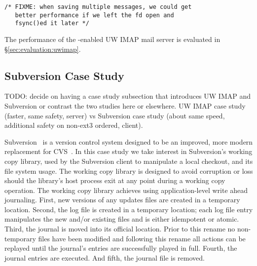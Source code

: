 \vspace{-0.5\baselineskip}
\begin{scriptsize}
\begin{verbatim}
/* FIXME: when saving multiple messages, we could get
   better performance if we left the fd open and
   fsync()ed it later */
\end{verbatim}
\end{scriptsize}
\vspace{-0.5\baselineskip}

The performance of the \opgroup{}-enabled UW IMAP mail server is
evaluated in \S\ref{sec:evaluation:uwimap}.

\subsection{Subversion Case Study}
\label{sec:opgroup:svn}

TODO: decide on having a case study subsection that introduces UW IMAP
and Subversion or contrast the two studies here or elsewhere.
%
UW IMAP case study (faster, same safety, server) vs
Subversion case study (about same speed, additional safety on non-ext3
ordered, client).

Subversion~\cite{svn} is a version control system designed to be an
improved, more modern replacement for CVS~\cite{cvs}. In this case
study we take interest in Subversion's working copy library, used by
the Subversion client to manipulate a local checkout, and its file
system usage.
%
The working copy library is designed to avoid corruption or loss
should the library's host process exit at any point during a working
copy operation. The working copy library achieves using
application-level write ahead journaling.
%
First, new versions of any updates files are created in a temporary
location. Second, the log file is created in a temporary location;
each log file entry manipulates the new and/or existing files and is
either idempotent or atomic. Third, the journal is moved into its
official location. Prior to this rename no non-temporary files have
been modified and following this rename all actions can be replayed
until the journal's entries are successfully played in full. Fourth,
the journal entries are executed.  And fifth, the journal file is
removed.

